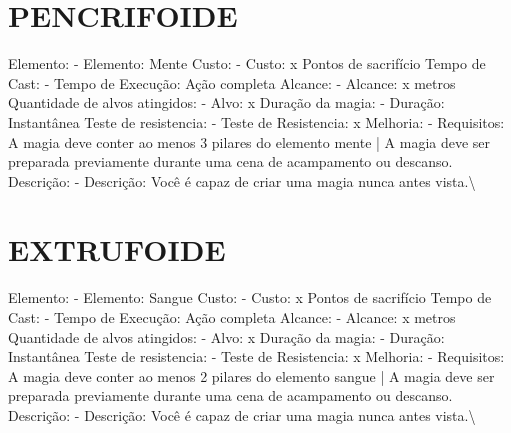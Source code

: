 \documentclass{article}%
\begin{document}
\section{PENCRIFOIDE}%
\label{sec:PENCRIFOIDE}%
Elemento: {-} Elemento: Mente\newline%
Custo: {-} Custo: x Pontos de sacrifício\newline%
Tempo de Cast: {-} Tempo de Execução: Ação completa\newline%
Alcance: {-} Alcance: x metros\newline%
Quantidade de alvos atingidos: {-} Alvo: x\newline%
Duração da magia: {-} Duração: Instantânea\newline%
Teste de resistencia: {-} Teste de Resistencia: x\newline%
Melhoria: {-} Requisitos: A magia deve conter ao menos 3 pilares do elemento mente | A magia deve ser preparada previamente durante uma cena de acampamento ou descanso.\newline%
Descrição: {-} Descrição: Você é capaz de criar uma magia nunca antes vista.\textbackslash{}

%
\section{EXTRUFOIDE}%
\label{sec:EXTRUFOIDE}%
Elemento: {-} Elemento: Sangue\newline%
Custo: {-} Custo: x Pontos de sacrifício\newline%
Tempo de Cast: {-} Tempo de Execução: Ação completa\newline%
Alcance: {-} Alcance: x metros\newline%
Quantidade de alvos atingidos: {-} Alvo: x\newline%
Duração da magia: {-} Duração: Instantânea\newline%
Teste de resistencia: {-} Teste de Resistencia: x\newline%
Melhoria: {-} Requisitos: A magia deve conter ao menos 2 pilares do elemento sangue | A magia deve ser preparada previamente durante uma cena de acampamento ou descanso.\newline%
Descrição: {-} Descrição: Você é capaz de criar uma magia nunca antes vista.\textbackslash{}

%
\end{document}
